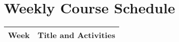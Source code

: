 \section*{Weekly Course Schedule}
\begin{longtable*}{| C{0.5in} || p{6in} |}
	\hline
	\textbf{Week} & \textbf{Title and Activities} \\[4pt]
	\hline
	\endhead
	
\end{longtable*}
